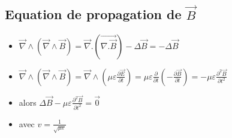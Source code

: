 \documentclass[12pt]{book}
\begin{document}
            \subsection{Equation de propagation de $\vec{B}$}
                \begin{itemize}
                    \item $\vec{\nabla}\wedge(\vec{\nabla}\wedge\vec{B}) =\vec{\nabla}.(\vec{\nabla.\vec{B}}) - \Delta\vec{B} = -\Delta\vec{B}$
                    \item $\vec{\nabla}\wedge(\vec{\nabla}\wedge\vec{B}) = \vec{\nabla}\wedge(\mu\varepsilon\frac{\partial\vec{E}}{\partial t} )= \mu \varepsilon \frac{\partial}{\partial t}(-\frac{\partial \vec{B}}{\partial t}) = -\mu\varepsilon\frac{\partial^2\vec{B}}{\partial t^2}$
                    \item alors $\Delta \vec{B} - \mu \varepsilon \frac{\partial^2\vec{B}}{\partial t^2} = \vec{0}$
                    \item \begin{center}
                         avec $ v= \frac{1}{\sqrt{\mu\varepsilon}}$
                    \end{center}


                \end{itemize}
\end{document}
